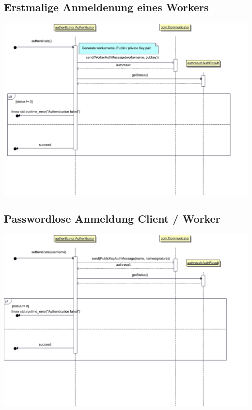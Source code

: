 \documentclass[a4paper,12pt]{article}
\begin{document}
\clearpage

\subsection{Erstmalige Anmeldenung eines Workers}

\includegraphics[width=\textwidth]{Authenticator/WorkerAuth}

\clearpage

\subsection{Passwordlose Anmeldung Client / Worker}

\includegraphics[width=\textwidth]{Authenticator/PublicKeyAuth}
\printnoidxglossaries
\end{document}
